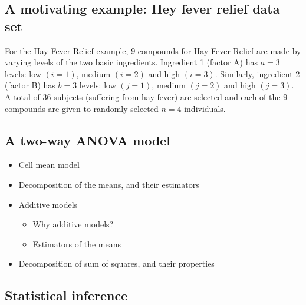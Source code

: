 \documentclass[12pt,]{book}
\providecommand{\tightlist}{%
  \setlength{\itemsep}{0pt}\setlength{\parskip}{0pt}}
\begin{document}
\subsection{A motivating example: Hey fever relief data
set}\label{a-motivating-example-hey-fever-relief-data-set}

For the Hay Fever Relief example, 9 compounds for Hay Fever Relief are
made by varying levels of the two basic ingredients. Ingredient 1
(factor A) has \(a = 3\) levels: low \((i = 1)\), medium \((i = 2)\) and
high \((i = 3)\). Similarly, ingredient 2 (factor B) has \(b = 3\)
levels: low \((j = 1)\), medium \((j = 2)\) and high \((j = 3)\). A
total of 36 subjects (suffering from hay fever) are selected and each of
the 9 compounds are given to randomly selected \(n = 4\) individuals.

\subsection{A two-way ANOVA model}\label{a-two-way-anova-model}

\begin{itemize}
\tightlist
\item
  Cell mean model
\item
  Decomposition of the means, and their estimators
\item
  Additive models

  \begin{itemize}
  \tightlist
  \item
    Why additive models?
  \item
    Estimators of the means
  \end{itemize}
\item
  Decomposition of sum of squares, and their properties
\end{itemize}

\subsection{Statistical inference}\label{statistical-inference-1}
\end{document}
